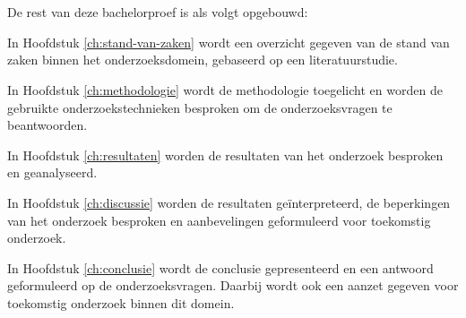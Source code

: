\section{}
\label{sec:opzet-bachelorproef}

De rest van deze bachelorproef is als volgt opgebouwd:

In Hoofdstuk \ref{ch:stand-van-zaken} wordt een overzicht gegeven van de stand van zaken binnen het onderzoeksdomein, gebaseerd op een literatuurstudie.

In Hoofdstuk \ref{ch:methodologie} wordt de methodologie toegelicht en worden de gebruikte onderzoekstechnieken besproken om de onderzoeksvragen te beantwoorden.

In Hoofdstuk \ref{ch:resultaten} worden de resultaten van het onderzoek besproken en geanalyseerd.

In Hoofdstuk \ref{ch:discussie} worden de resultaten geïnterpreteerd, de beperkingen van het onderzoek besproken en aanbevelingen geformuleerd voor toekomstig onderzoek.

In Hoofdstuk \ref{ch:conclusie} wordt de conclusie gepresenteerd en een antwoord geformuleerd op de onderzoeksvragen. Daarbij wordt ook een aanzet gegeven voor toekomstig onderzoek binnen dit domein.